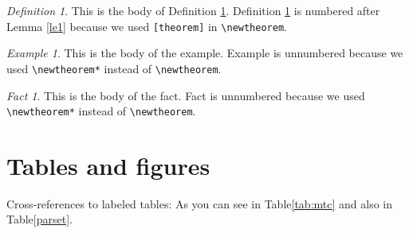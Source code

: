 \documentclass[aoas]{imsart}
\numberwithin{equation}{section}
\theoremstyle{plain}
\theoremstyle{remark}
\newtheorem{definition}[theorem]{Definition}
\newtheorem*{example}{Example}
\newtheorem*{fact}{Fact}
\begin{document}
\begin{definition}
\label{de1} This is the body of Definition \ref{de1}. Definition
\ref{de1} is numbered after Lemma \ref{le1} because we used
\verb|[theorem]| in \verb|\newtheorem|.

\end{definition}

\begin{example}
This is the body of the example. Example is unnumbered because we used
\verb|\newtheorem*| instead of \verb|\newtheorem|.

\end{example}

\begin{fact}
This is the body of the fact. Fact is unnumbered because we used
\verb|\newtheorem*| instead of \verb|\newtheorem|.

\end{fact}

\hypertarget{tables-and-figures}{%
\section{Tables and figures}\label{tables-and-figures}}

Cross-references to labeled tables: As you can see in Table\ref{tab:mtc}
and also in Table\ref{parset}.
\end{document}
